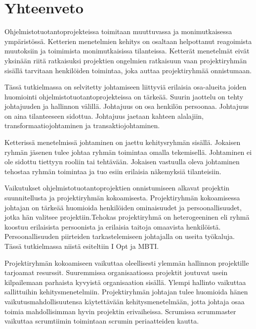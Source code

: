 \documentclass[finnish]{tktltiki2}
\theoremstyle{definition}
\theoremstyle{remark}
\begin{document}
  



\section{Yhteenveto}

Ohjelmistotuotantoprojekteissa toimitaan muuttuvassa ja monimutkaisessa ympäristössä. Ketterien menetelmien kehitys on osaltaan helpottanut reagoimista muutoksiin ja toimimista monimutkaisissa tilanteissa. Ketterät menetelmät eivät yksinään riitä ratkaisuksi projektien ongelmien ratkaisuun vaan projektiryhmän sisällä tarvitaan henkilöiden toimintaa, joka auttaa projektiryhmää onnistumaan.

Tässä tutkielmassa on selvitetty johtamiseen liittyviä erilaisia osa-alueita joiden huomiointi ohjelmistotuotantoprojekteissa on tärkeää. Suurin jaottelu on tehty johtajuuden ja hallinnon välillä. Johtajuus on osa henkilön persoonaa. Johtajuus on aina tilanteeseen sidottua. Johtajuus jaetaan kahteen alalajiin, transformaatiojohtaminen ja transaktiojohtaminen.

Ketterissä menetelmissä johtaminen on jaettu kehitysryhmän sisällä. Jokaisen ryhmän jäsenen tulee johtaa ryhmän toimintaa omalla tekemisellä. Johtaminen ei ole sidottu tiettyyn rooliin tai tehtävään. Jokaisen vastuulla oleva johtaminen tehostaa ryhmän toimintaa ja tuo esiin erilaisia näkemyksiä tilanteisiin.

Vaikutukset ohjelmistotuotantoprojektien onnistumiseen alkavat projektin suunnitellusta ja projektiryhmän kokoamisesta. Projektiryhmän kokoamisessa johtajan on tärkeää huomioida henkilöiden ominaisuudet ja persoonallisuudet, jotka hän valitsee projektiin.Tehokas projektiryhmä on heterogeeninen eli ryhmä koostuu erilaisista persoonista ja erilaisia taitoja omaavista henkilöistä. Persoonallisuuden piirteiden tarkastelemiseen johtajalla on useita työkaluja. Tässä tutkielmassa niistä esiteltiin I Opt ja MBTI.

Projektiryhmän kokoamiseen vaikuttaa oleellisesti ylemmän hallinnon projektille tarjoamat resurssit. Suuremmissa organisaatiossa projektit joutuvat usein kilpailemaan parhaista kyvyistä organisaation sisällä. Ylempi hallinto vaikuttaa sallittuihin kehitysmenetelmiin. Projektiryhmän johtajan tulee huomioida hänen vaikutusmahdollisuutensa käytettävään kehitysmenetelmään, jotta johtaja osaa toimia mahdollisimman hyvin projektin erivaiheissa. Scrumissa scrummaster vaikuttaa scrumtiimin toimintaan scrumin periaatteiden kautta.
\end{document}
